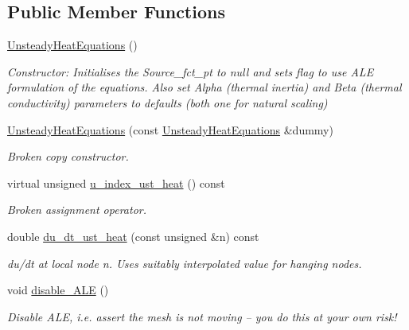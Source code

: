 \subsection*{Public Member Functions}
\begin{DoxyCompactItemize}
\item 
\hyperlink{classoomph_1_1UnsteadyHeatEquations_a773834143700adb827991fc25eb95f9d}{Unsteady\+Heat\+Equations} ()
\begin{DoxyCompactList}\small\item\em Constructor\+: Initialises the Source\+\_\+fct\+\_\+pt to null and sets flag to use A\+LE formulation of the equations. Also set Alpha (thermal inertia) and Beta (thermal conductivity) parameters to defaults (both one for natural scaling) \end{DoxyCompactList}\item 
\hyperlink{classoomph_1_1UnsteadyHeatEquations_a440e40749643bf2ef3c06b086064502c}{Unsteady\+Heat\+Equations} (const \hyperlink{classoomph_1_1UnsteadyHeatEquations}{Unsteady\+Heat\+Equations} \&dummy)
\begin{DoxyCompactList}\small\item\em Broken copy constructor. \end{DoxyCompactList}\item 
virtual unsigned \hyperlink{classoomph_1_1UnsteadyHeatEquations_ae8d208c5b107bbdf5b5ef28e33f0b6c6}{u\+\_\+index\+\_\+ust\+\_\+heat} () const
\begin{DoxyCompactList}\small\item\em Broken assignment operator. \end{DoxyCompactList}\item 
double \hyperlink{classoomph_1_1UnsteadyHeatEquations_ad5a19b842365b704972610e115adb3c9}{du\+\_\+dt\+\_\+ust\+\_\+heat} (const unsigned \&n) const
\begin{DoxyCompactList}\small\item\em du/dt at local node n. Uses suitably interpolated value for hanging nodes. \end{DoxyCompactList}\item 
void \hyperlink{classoomph_1_1UnsteadyHeatEquations_a25113368ba4d7b4b054ca4a046fe9ff7}{disable\+\_\+\+A\+LE} ()
\begin{DoxyCompactList}\small\item\em Disable A\+LE, i.\+e. assert the mesh is not moving -- you do this at your own risk! \end{DoxyCompactList}\item 

\end{DoxyCompactItemize}
